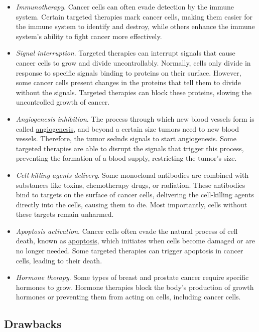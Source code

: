 \begin{itemize}
    \item \textit{Immunotherapy}. Cancer cells can often evade detection by the immune system. Certain targeted therapies mark cancer cells, making them easier for the immune system to identify and destroy, while others enhance the immune system's ability to fight cancer more effectively.
    \item \textit{Signal interruption}. Targeted therapies can interrupt signals that cause cancer cells to grow and divide uncontrollably. Normally, cells only divide in response to specific signals binding to proteins on their surface. However, some cancer cells present changes in the proteins that tell them to divide without the signals. Targeted therapies can block these proteins, slowing the uncontrolled growth of cancer.
    \item \textit{Angiogenesis inhibition}. The process through which new blood vessels form is called \href{https://en.wikipedia.org/wiki/Angiogenesis}{angiogenesis}, and beyond a certain size tumors need to new blood vessels. Therefore, the tumor sednds signals to start angiogenesis. Some targeted therapies are able to disrupt the signals that trigger this process, preventing the formation of a blood supply, restricting the tumor's size. 
    \item \textit{Cell-killing agents delivery}. Some monoclonal antibodies are combined with substances like toxins, chemotherapy drugs, or radiation. These antibodies bind to targets on the surface of cancer cells, delivering the cell-killing agents directly into the cells, causing them to die. Most importantly, cells without these targets remain unharmed.
    \item \textit{Apoptosis activation}. Cancer cells often evade the natural process of cell death, known as \href{https://en.wikipedia.org/wiki/Apoptosis}{apoptosis}, which initiates when cells become damaged or are no longer needed. Some targeted therapies can trigger apoptosis in cancer cells, leading to their death.
    \item \textit{Hormone therapy}. Some types of breast and prostate cancer require specific hormones to grow. Hormone therapies block the body's production of growth hormones or preventing them from acting on cells, including cancer cells.
\end{itemize}

\subsection{Drawbacks}


